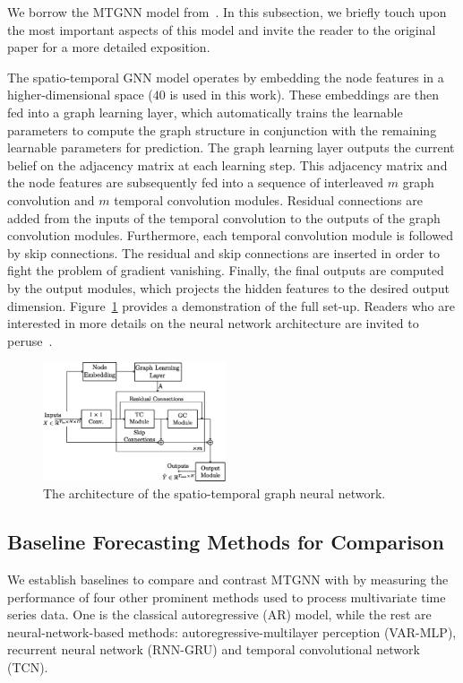 We borrow the MTGNN model from~\cite{wu2020connecting}. In this subsection, we briefly touch upon the 
most important aspects of this model and invite the reader to the original paper for a more detailed 
exposition.

The spatio-temporal GNN model operates by embedding the node features in a higher-dimensional space
($40$ is used in this work). These embeddings are then fed into a graph learning layer, which automatically
trains the learnable parameters to compute the graph structure in conjunction with the remaining learnable
parameters for prediction. The graph learning layer outputs the current belief on the adjacency matrix at 
each learning step. This adjacency matrix and the node features are subsequently fed into a sequence of 
interleaved $m$ graph convolution and $m$ temporal convolution modules. Residual connections are added from
the inputs of the temporal convolution to the outputs of the graph convolution modules. Furthermore, 
each temporal convolution module is followed by skip connections. The residual and skip connections are 
inserted in order to fight the problem of gradient vanishing. Finally, the final outputs are computed 
by the output modules, which projects the hidden features to the desired output dimension. 
Figure~\ref{fig:gnn_architecture} provides a demonstration of the full set-up. Readers who are interested 
in more details on the neural network architecture are invited to peruse~\citep{wu2020connecting}.

%
\begin{figure}[tbh]
  \centering
  \includegraphics[width=0.48\textwidth]{./figures/gnn_architecture_v1.eps}
  \caption{The architecture of the spatio-temporal graph neural network.} 
  \label{fig:gnn_architecture}
\end{figure}
%

\subsection{Baseline Forecasting Methods for Comparison}
\label{ssec:multi_ts}
%
We establish baselines to compare and contrast MTGNN with by measuring the performance of four other 
prominent methods used to process multivariate time series data. One is the classical autoregressive (AR) model, 
while the rest are neural-network-based methods: autoregressive-multilayer perception (VAR-MLP), 
recurrent neural network (RNN-GRU) and temporal convolutional network (TCN).


